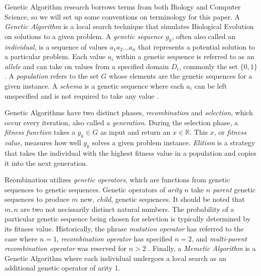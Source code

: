 Genetic Algorithm research borrows terms from both Biology and Computer Science, so we will set up some conventions on terminology for this paper. A \emph{Genetic Algorithm} is a local search technique that simulates Biological Evolution on solutions to a given problem. A \emph{genetic sequence} $g_k$, often also called an \emph{individual}, is a sequence of values $a_1 a_2\ldots a_n$ that represents a potential solution to a particular problem. Each value $a_i$ within a genetic sequence is referred to as an \emph{allele} and can take on values from a specified domain $D_i$, commonly the set $\{0,1\}$. A \emph{population} refers to the set $G$ whose elements are the genetic sequences for a given instance. A \emph{schema} is a genetic sequence where each $a_i$ can be left unspecified and is not required to take any value \cite{Russell10}. 

Genetic Algorithms have two distinct phases, \emph{recombination} and \emph{selection}, which occur every iteration, also called a \emph{generation}. During the selection phase, a \emph{fitness function} takes a $g_k \in G$ as input and return an $x \in \mathbb{R}$. This $x$, or \emph{fitness value}, measures how well $g_k$ solves a given problem instance. \emph{Elitism} is a strategy that takes the individual with the highest fitness value in a population and copies it into the next generation.

Reombination utilizes \emph{genetic operators}, which are functions from genetic sequences to genetic sequences. Genetic operators of \emph{arity} $n$ take $n$ \emph{parent} genetic sequences to produce $m$ new, \emph{child}, genetic sequences. It should be noted that $m, n$ are two not necissarily distinct natural numbers. The probability of a particular genetic sequence being chosen for selection is typically determined by its fitness value. Historically, the phrase \emph{mutation operator} has referred to the case where $n = 1$, \emph{recombination operator} has specified $n = 2$, and \emph{multi-parent recombination operator} was reserved for $n > 2$ \cite{Eiben94}. Finally, a \emph{Memetic Algorithm} is a Genetic Algorithm where each individual undergoes a local search as an additional genetic operator of arity 1.